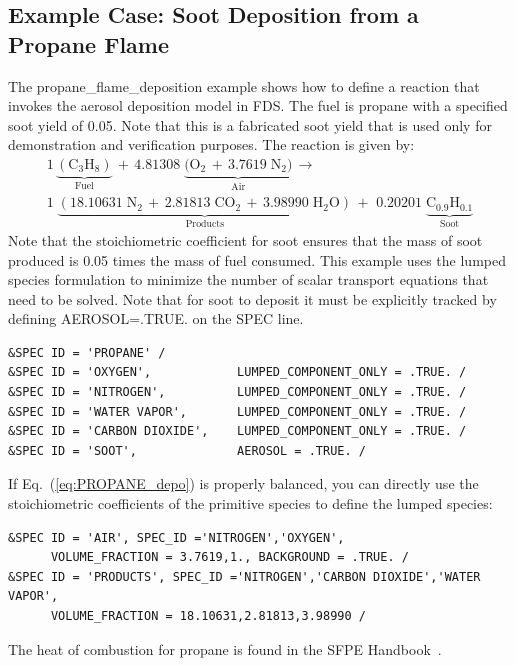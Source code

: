 \documentclass[11pt]{book}
\begin{document}
\subsection{Example Case: Soot Deposition from a Propane Flame}

The {\ct propane\_flame\_deposition} example shows how to define a reaction that invokes the aerosol deposition model in FDS. The fuel is propane with a specified soot yield of 0.05. Note that this is a fabricated soot yield that is used only for demonstration and verification purposes. The reaction is given by:
\begin{multline}\label{eq:PROPANE_depo}
1\,\underbrace{\mathrm{(C_3H_8)}}_\text{Fuel} \,+\, 4.81308 \; \underbrace{\mathrm{(O_2\,+\, 3.7619 \; N_2})}_\text{Air} \, \longrightarrow \\
1 \; \underbrace{\mathrm{(18.10631 \; N_2 \, + \, 2.81813 \; CO_2 \,+ \, 3.98990\; H_2O)}}_\text{Products} \,+\,
\,0.20201 \; \underbrace{\mathrm{C_{0.9}H_{0.1}}}_\text{Soot}
\end{multline}
Note that the stoichiometric coefficient for soot ensures that the mass of soot produced is 0.05 times the mass of fuel consumed. This example uses the lumped species formulation to minimize the number of scalar transport equations that need to be solved. Note that for soot to deposit it must be explicitly tracked by defining {\ct AEROSOL=.TRUE.} on the {\ct SPEC} line.
\begin{lstlisting}
&SPEC ID = 'PROPANE' /
&SPEC ID = 'OXYGEN',            LUMPED_COMPONENT_ONLY = .TRUE. /
&SPEC ID = 'NITROGEN',          LUMPED_COMPONENT_ONLY = .TRUE. /
&SPEC ID = 'WATER VAPOR',       LUMPED_COMPONENT_ONLY = .TRUE. /
&SPEC ID = 'CARBON DIOXIDE',    LUMPED_COMPONENT_ONLY = .TRUE. /
&SPEC ID = 'SOOT',              AEROSOL = .TRUE. /
\end{lstlisting}
If Eq.~(\ref{eq:PROPANE_depo}) is properly balanced, you can directly use the stoichiometric coefficients of the primitive species to define the lumped species:

\begin{lstlisting}
&SPEC ID = 'AIR', SPEC_ID ='NITROGEN','OXYGEN',
      VOLUME_FRACTION = 3.7619,1., BACKGROUND = .TRUE. /
&SPEC ID = 'PRODUCTS', SPEC_ID ='NITROGEN','CARBON DIOXIDE','WATER VAPOR',
      VOLUME_FRACTION = 18.10631,2.81813,3.98990 /
\end{lstlisting}

\noindent
The heat of combustion for propane is found in the SFPE Handbook~\cite{SFPE:Tewarson}.
\end{document}

